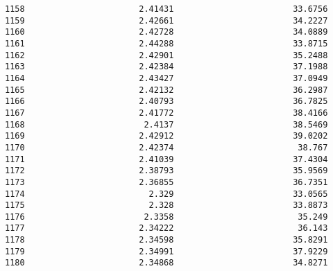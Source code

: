 \documentclass[11pt]{article}
\begin{document}
\begin{tcolorbox}[breakable, size=fbox, boxrule=.5pt, pad at break*=1mm, opacityfill=0]
\begin{Verbatim}[commandchars=\\\{\}]
1158                       2.41431                        33.6756
1159                       2.42661                        34.2227
1160                       2.42728                        34.0889
1161                       2.44288                        33.8715
1162                       2.42901                        35.2488
1163                       2.42384                        37.1988
1164                       2.43427                        37.0949
1165                       2.42132                        36.2987
1166                       2.40793                        36.7825
1167                       2.41772                        38.4166
1168                        2.4137                        38.5469
1169                       2.42912                        39.0202
1170                       2.42374                         38.767
1171                       2.41039                        37.4304
1172                       2.38793                        35.9569
1173                       2.36855                        36.7351
1174                         2.329                        33.0565
1175                         2.328                        33.8873
1176                        2.3358                         35.249
1177                       2.34222                         36.143
1178                       2.34598                        35.8291
1179                       2.34991                        37.9229
1180                       2.34868                        34.8271


\end{Verbatim}
\end{tcolorbox}
\end{document}
